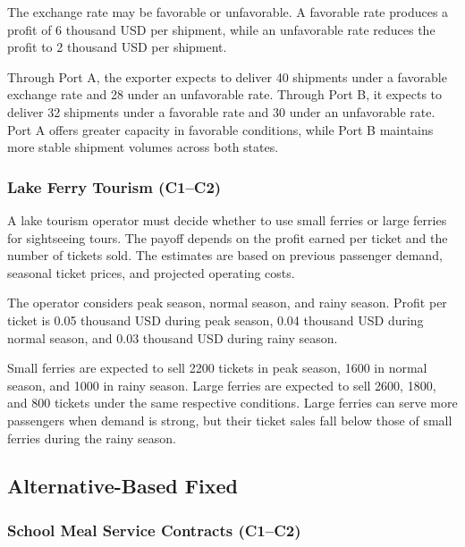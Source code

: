 	The exchange rate may be favorable or unfavorable. A favorable rate produces a profit of 6 thousand USD per shipment, while an unfavorable rate reduces the profit to 2 thousand USD per shipment.
	
	Through Port A, the exporter expects to deliver 40 shipments under a favorable exchange rate and 28 under an unfavorable rate. Through Port B, it expects to deliver 32 shipments under a favorable rate and 30 under an unfavorable rate. Port A offers greater capacity in favorable conditions, while Port B maintains more stable shipment volumes across both states.
	
	\subsubsection{Lake Ferry Tourism (C1--C2)}
	\label{sec:problem9-lake-ferry-tourism-c1-c2}
	
	A lake tourism operator must decide whether to use small ferries or large ferries for sightseeing tours. The payoff depends on the profit earned per ticket and the number of tickets sold. The estimates are based on previous passenger demand, seasonal ticket prices, and projected operating costs.
	
	The operator considers peak season, normal season, and rainy season. Profit per ticket is 0.05 thousand USD during peak season, 0.04 thousand USD during normal season, and 0.03 thousand USD during rainy season.
	
	Small ferries are expected to sell 2200 tickets in peak season, 1600 in normal season, and 1000 in rainy season. Large ferries are expected to sell 2600, 1800, and 800 tickets under the same respective conditions. Large ferries can serve more passengers when demand is strong, but their ticket sales fall below those of small ferries during the rainy season.


	\subsection{Alternative-Based Fixed}
	\label{sec:alternative-based-fixed-payoff-only}



	\subsubsection{School Meal Service Contracts (C1--C2)}
	\label{sec:problem10-school-meal-service-contracts-c1-c2}
	
